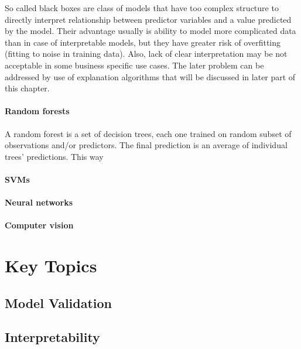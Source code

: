 \documentclass[
]{book}
\begin{document}
So called black boxes are class of models that have too complex structure to directly
interpret relationship between predictor variables and a value predicted by the model.
Their advantage usually is ability to model more complicated data than in case of
interpretable models, but they have greater risk of overfitting (fitting to
noise in training data). Also, lack of clear interpretation may be not acceptable
in some business specific use cases. The later problem can be addressed by use of
explanation algorithms that will be discussed in later part of this chapter.

\hypertarget{random-forests}{%
\paragraph{Random forests}\label{random-forests}}

A random forest is a set of decision trees, each one trained on random subset
of observations and/or predictors. The final prediction is an average of individual
trees' predictions. This way

\hypertarget{svms}{%
\paragraph{SVMs}\label{svms}}

\hypertarget{neural-networks}{%
\paragraph{Neural networks}\label{neural-networks}}

\hypertarget{computer-vision}{%
\paragraph{Computer vision}\label{computer-vision}}

\hypertarget{key-topics}{%
\section{Key Topics}\label{key-topics}}

\hypertarget{model-validation}{%
\subsection{Model Validation}\label{model-validation}}

\hypertarget{interpretability}{%
\subsection{Interpretability}\label{interpretability}}
\end{document}
